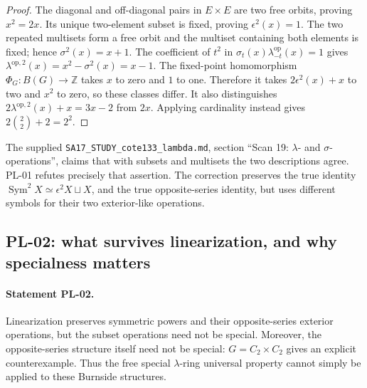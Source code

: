 \begin{proof}
The diagonal and off-diagonal pairs in $E\times E$ are two free orbits, proving
$x^2=2x$. Its unique two-element subset is fixed, proving $\epsilon^2(x)=1$.
The two repeated multisets form a free orbit and the multiset containing both
elements is fixed; hence $\sigma^2(x)=x+1$. The coefficient of $t^2$ in
$\sigma_t(x)\lambda^{\mathrm{op}}_{-t}(x)=1$ gives
$\lambda^{\mathrm{op},2}(x)=x^2-\sigma^2(x)=x-1$.
The fixed-point homomorphism $\Phi_G:B(G)\to\mathbb Z$ takes $x$ to zero
and $1$ to one. Therefore it takes $2\epsilon^2(x)+x$ to two and $x^2$ to
zero, so these classes differ. It also distinguishes
$2\lambda^{\mathrm{op},2}(x)+x=3x-2$ from $2x$.
Applying cardinality instead gives $2\binom{2}{2}+2=2^2$.
\end{proof}

The supplied \texttt{SA17\_STUDY\_cote133\_lambda.md}, section
``Scan 19: $\lambda$- and $\sigma$-operations'', claims that with subsets and
multisets the two descriptions agree. PL-01 refutes precisely that assertion.
The correction preserves the true identity
$\operatorname{Sym}^2X\simeq\epsilon^2X\sqcup X$, and the true opposite-series
identity, but uses different symbols for their two exterior-like operations.

\subsection{PL-02: what survives linearization, and why specialness matters}
\paragraph{Statement PL-02.}
Linearization preserves symmetric powers and their opposite-series exterior
operations, but the subset operations need not be special. Moreover, the
opposite-series structure itself need not be special: $G=C_2\times C_2$ gives
an explicit counterexample. Thus the free special $\lambda$-ring universal
property cannot simply be applied to these Burnside structures.

